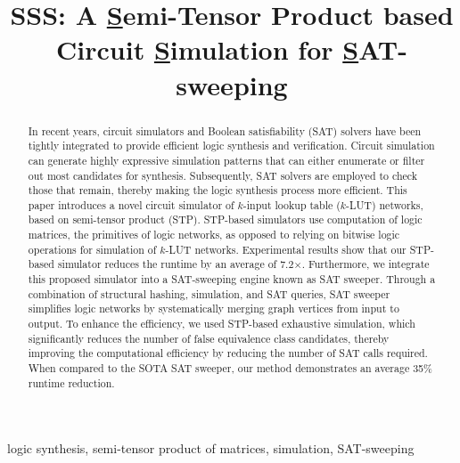 \documentclass[conference]{IEEEtran}
\begin{document}
\title{SSS: A \underline{S}emi-Tensor Product based Circuit \underline{S}imulation for \underline{S}AT-sweeping}
\maketitle
\vspace{-10em}

\begin{abstract}
In recent years, circuit simulators and Boolean satisfiability (SAT) solvers have been tightly integrated to provide efficient logic synthesis and verification.
Circuit simulation can generate highly expressive simulation patterns that can either enumerate or filter out most candidates for synthesis.
Subsequently, SAT solvers are employed to check those that remain, thereby making the logic synthesis process more efficient.
This paper introduces a novel circuit simulator of $k$-input lookup table ($k$-LUT) networks, based on semi-tensor product (STP).
STP-based simulators use computation of logic matrices, the primitives of logic networks, as opposed to relying on bitwise logic operations for simulation of $k$-LUT networks.
Experimental results show that our STP-based simulator reduces the runtime by an average of 7.2$\times$.
Furthermore, we integrate this proposed simulator into a SAT-sweeping engine known as SAT sweeper.
Through a combination of structural hashing, simulation, and SAT queries, SAT sweeper simplifies logic networks by systematically merging graph vertices from input to output.
To enhance the efficiency, we used STP-based exhaustive simulation, which significantly reduces the number of false equivalence class candidates, thereby improving the computational efficiency by reducing the number of SAT calls required.
When compared to the SOTA SAT sweeper, our method demonstrates an average 35\% runtime reduction.
\end{abstract}

\begin{IEEEkeywords}
logic synthesis, semi-tensor product of matrices, simulation, SAT-sweeping
\end{IEEEkeywords}
\end{document}
